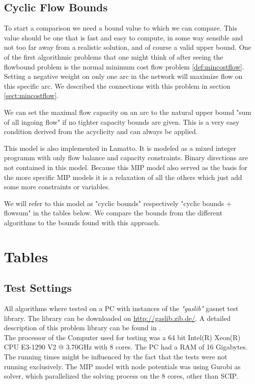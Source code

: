 \subsection{Cyclic Flow Bounds}%
\label{model:cyclicFlow}
To start a comparison we need a bound value to which we can compare. This value should be one that is fast and 
easy to compute, in some way sensible and not too far away from a realistic solution, and of course a valid upper 
bound. 
One of the first algorithmic problems that one might think of after seeing the flowbound problem is the normal minimum 
cost flow problem \ref{def:mincostflow}. Setting a negative weight on only one arc in the network will 
maximize flow on this specific arc. We described the connections with this problem in section \ref{sect:mincostflow}. 

We can set the maximal flow capacity on an arc to the natural upper bound "sum of all ingoing flow" if no tighter 
capacity bounds are given. This is a very easy condition derived from the acyclicity and can always be applied.

This model is also implemented in Lamatto. It is modeled as a mixed integer programm with only flow balance and 
capacity constraints. Binary directions are not contained in this model. Because this MIP model also served as the 
basis for the more specific MIP models it is a relaxation of all the others which just add some more constraints or 
variables.

We will refer to this model as "cyclic bounds" respectively "cyclic bounds + flowsum" in the tables below. We compare 
the bounds from the different algorithms to the bounds found with this approach. 


\section{Tables}
\subsection{Test Settings}

All algorithms where tested on a PC with instances of the \textit{"gaslib"} gasnet test library. The library can be 
downloaded on \url{http://gaslib.zib.de/}. A detailed description of this problem library can be found in 
\cite{HumpolaJoormannOucherifPfetschScheweSchmidtSchwarz:2015}.\\
The processor of the Computer used for testing was a 64 bit Intel(R) Xeon(R) CPU E3-1290 V2 @ 3.70GHz with 8 cores. The 
PC had a RAM of 16 Gigabytes. The running times might be influenced by the fact that the tests were not running 
exclusively. The MIP model with node potentials was using Gurobi as solver, which parallelized the solving process on 
the 8 cores, other than SCIP. 


